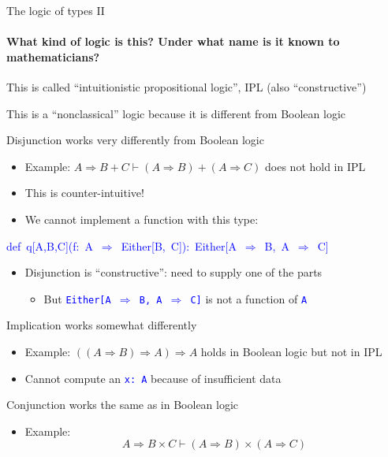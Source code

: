 \documentclass[english]{beamer}
\newenvironment{lyxcode}
   {\par\begin{list}{}{
     \setlength{\rightmargin}{\leftmargin}
     \setlength{\listparindent}{0pt}%
     \raggedright
     \setlength{\itemsep}{0pt}
     \setlength{\parsep}{0pt}
     \normalfont\ttfamily}%
    \def\{{\char`\{}
    \def\}{\char`\}}
    \def\textasciitilde{\char`\~}
    \item[]}
   {\end{list}}
\begin{document}
\begin{frame}{The logic of types II}


\framesubtitle{What kind of logic is this? Under what name is it known to mathematicians?}

This is called ``intuitionistic propositional logic'', IPL (also
``constructive'')
\begin{itemize}
\item This is a ``nonclassical'' logic because it is different from Boolean
logic
\item Disjunction works very differently from Boolean logic
\begin{itemize}
\item Example: $A\Rightarrow B+C\vdash(A\Rightarrow B)+(A\Rightarrow C)$
does not hold in IPL
\item This is counter-intuitive!
\item We cannot implement a function with this type:
\end{itemize}
\begin{lyxcode}
\textcolor{blue}{\footnotesize{}def~q{[}A,B,C{]}(f:~A~$\Rightarrow$~Either{[}B,~C{]}):~Either{[}A~$\Rightarrow$~B,~A~$\Rightarrow$~C{]}}{\footnotesize \par}
\end{lyxcode}
\begin{itemize}
\item Disjunction is ``constructive'': need to supply one of the parts
\begin{itemize}
\item But \texttt{\textcolor{blue}{\footnotesize{}Either{[}A $\Rightarrow$
B, A $\Rightarrow$ C{]}}} is not a function of \texttt{\textcolor{blue}{\footnotesize{}A}} 
\end{itemize}
\end{itemize}
\item Implication works somewhat differently
\begin{itemize}
\item Example: $\left(\left(A\Rightarrow B\right)\Rightarrow A\right)\Rightarrow A$
holds in Boolean logic but not in IPL
\item Cannot compute an \texttt{\textcolor{blue}{\footnotesize{}x:\ A}}
because of insufficient data
\end{itemize}
\item Conjunction works the same as in Boolean logic
\begin{itemize}
\item Example: 
\[
A\Rightarrow B\times C\vdash\left(A\Rightarrow B\right)\times\left(A\Rightarrow C\right)
\]
 
\end{itemize}
\end{itemize}
\end{frame}
\end{document}
